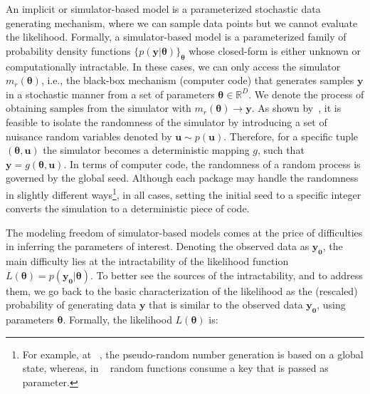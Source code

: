 \documentclass[article]{jss}
\newcommand{\ub}{\mathbf{u}}
\newcommand{\yb}{\mathbf{y}}
\newcommand{\thetab}{\boldsymbol{\theta}}
\newcommand{\simulator}{g}
\newcommand{\data}{\mathbf{y_0}}
\begin{document}
An implicit or simulator-based model is a parameterized stochastic
data generating mechanism, where we can sample data points but we
cannot evaluate the likelihood. Formally, a simulator-based model is a
parameterized family of probability density functions
\(\{ p(\yb|\thetab)\}_{\thetab}\) whose closed-form is either unknown
or computationally intractable. In these cases, we can only access the
simulator \( m_r(\thetab) \), i.e., the black-box mechanism (computer
code) that generates samples \(\yb\) in a stochastic manner from a set
of parameters \(\thetab \in \mathbb{R}^D\). We denote the process of obtaining samples
from the simulator with \( m_r(\thetab) \rightarrow \yb \). As shown
by~\citet{Meeds2015}, it is feasible to isolate the randomness of the
simulator by introducing a set of nuisance random variables denoted by
\(\ub \sim p(\ub)\). Therefore, for a specific tuple
\((\thetab, \ub)\) the simulator becomes a deterministic mapping
\(g\), such that \(\yb=\simulator(\thetab,\ub)\). In terms of computer
code, the randomness of a random process is governed by the global
seed. Although each package may handle the randomness in slightly
different ways\footnote{For example, at
  ~\citet{harris2020array}, the pseudo-random number
  generation is based on a global state, whereas, in
  ~\citet{jax2018github} random functions consume a key that
  is passed as parameter. }, in all cases, setting the initial seed to
a specific integer converts the simulation to a deterministic piece of
code.

The modeling freedom of simulator-based models comes at the price of
difficulties in inferring the parameters of interest. Denoting the
observed data as \(\data\), the main difficulty lies at the
intractability of the likelihood function
\(L(\thetab) = p(\data|\thetab)\). To better see the sources of the
intractability, and to address them, we go back to the basic
characterization of the likelihood as the (rescaled) probability of
generating data \(\yb\) that is similar to the observed data
\(\data\), using parameters \(\thetab\). Formally, the likelihood
\(L(\thetab)\) is:
\end{document}
